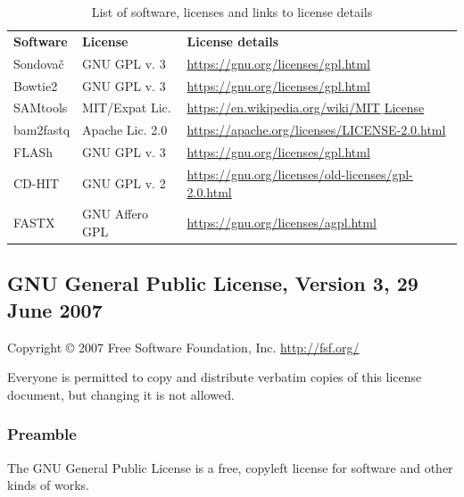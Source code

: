 \documentclass[a4paper, 11pt, twoside]{article}
\begin{document}
\begin{table}[htb]
\caption[List of software and licenses]{List of software, licenses and links to license details}
\begin{tabular}{lll}
\textbf{Software} & \textbf{License} & \textbf{License details}\\
Sondovač & GNU GPL v. 3 & \href{https://gnu.org/licenses/gpl.html}{https://gnu.org/licenses/gpl.html}\\
Bowtie2 & GNU GPL v. 3 & \href{https://gnu.org/licenses/gpl.html}{https://gnu.org/licenses/gpl.html}\\
SAMtools & MIT/Expat Lic. & \href{https://en.wikipedia.org/wiki/MIT_License}{https://en.wikipedia.org/wiki/MIT$\_$License}\\
bam2fastq & Apache Lic. 2.0 & \href{https://apache.org/licenses/LICENSE-2.0.html}{https://apache.org/licenses/LICENSE-2.0.html}\\
FLASh & GNU GPL v. 3 & \href{https://gnu.org/licenses/gpl.html}{https://gnu.org/licenses/gpl.html}\\
CD-HIT & GNU GPL v. 2 & \href{https://gnu.org/licenses/old-licenses/gpl-2.0.html}{https://gnu.org/licenses/old-licenses/gpl-2.0.html}\\
FASTX & GNU Affero GPL & \href{https://gnu.org/licenses/agpl.html}{https://gnu.org/licenses/agpl.html}
\end{tabular}
\label{software-lic}
\end{table}

\begingroup
\fontsize{7pt}{8pt}
\selectfont

\subsection{GNU General Public License, Version 3, 29 June 2007}

Copyright © 2007 Free Software Foundation, Inc. \href{http://fsf.org/}{http://fsf.org/}

Everyone is permitted to copy and distribute verbatim copies of this license document, but changing it is not allowed.

\subsubsection{Preamble}

The GNU General Public License is a free, copyleft license for software and other kinds of works.
\end{document}
